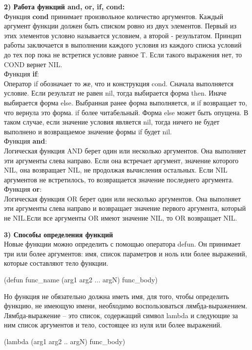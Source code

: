 \documentclass[a4paper, 12pt]{article}
\begin{document}
\hspace*{-13mm} \textbf{2) Работа функций and, or, if, cond:}
\\ Функция \textbf{cond} принимает произвольное количество аргументов. Каждый аргумент функции должен быть списком ровно из двух элементов. Первый из этих элементов условно называется условием, а второй - результатом. Принцип работы заключается в выполнении каждого условия из каждого списка условий до тех пор пока не встретися условие равное T. Если такого выражения нет, то COND вернет NIL.
\\Функция \textbf{if}:
\\ Оператор if обозначает то же, что и конструкция cond. Сначала выполняется условие. Если результат не равен nil, тогда выбирается форма then. Иначе выбирается форма else. Выбранная ранее форма выполняется, и if возвращает то, что вернула это форма. if более читабельный. Форма else может быть опущена. В таком случае, если значение условия является nil, тогда ничего не будет выполнено и возвращаемое значение формы if будет nil. 
\\Функция \textbf{and}:
\\Логическая функция AND берет один или несколько аргументов. Она выполняет эти аргументы слева направо. Если она встречает аргумент, значение которого NIL, она возвращает NIL, не продолжая вычисления остальных. Если NIL аргументов не встретилось, то возвращается значение последнего аргумента. 
\\Функция \textbf{or}:
\\Логическая функция OR берет один или несколько аргументов. Она выполняет эти аргументы слева направо и возвращает значение первого аргумента, который не NIL.Если все аргументы OR имеют значение NIL, то OR возвращает NIL. 



\hspace*{-8mm} \textbf{3) Способы определения функций}
\\Новые функции можно определить с помощью оператора defun. Он принимает три или более аргументов: имя, список параметров и ноль или более выражений, которые составляют тело функции. 

(defun func\_name (arg1 arg2 ... argN) func\_body)

Но функция не обязательно должна иметь имя, для того, чтобы определить функцию, не имеющую имени, необходимо воспользоваться лямбда-выражением. Лямбда-выражение – это список, содержащий символ lambda и следующие за ним список аргументов и тело, состоящее из нуля или более выражений.

(lambda (arg1 arg2 .. argN) func\_body)
\end{document}
